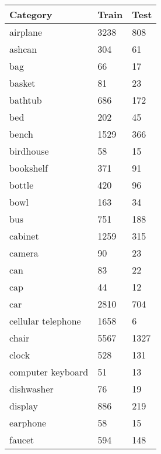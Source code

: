 \begin{table}[]
	\begin{tabular}[t]{lll}
		\hline
		\textbf{Category}  & \textbf{Train} & \textbf{Test} \\ \hline
		airplane           & 3238           & 808           \\
		ashcan             & 304            & 61            \\
		bag                & 66             & 17            \\
		basket             & 81             & 23            \\
		bathtub            & 686            & 172           \\
		bed                & 202            & 45            \\
		bench              & 1529           & 366           \\
		birdhouse          & 58             & 15            \\
		bookshelf          & 371            & 91            \\
		bottle             & 420            & 96            \\
		bowl               & 163            & 34            \\
		bus                & 751            & 188           \\
		cabinet            & 1259           & 315           \\
		camera             & 90             & 23            \\
		can                & 83             & 22            \\
		cap                & 44             & 12            \\
		car                & 2810           & 704           \\
		cellular telephone & 1658           & 6             \\
		chair              & 5567           & 1327          \\
		clock              & 528            & 131           \\
		computer keyboard  & 51             & 13            \\
		dishwasher         & 76             & 19            \\
		display            & 886            & 219           \\
		earphone           & 58             & 15            \\
		faucet             & 594            & 148           \\

\end{tabular}
\end{table}
